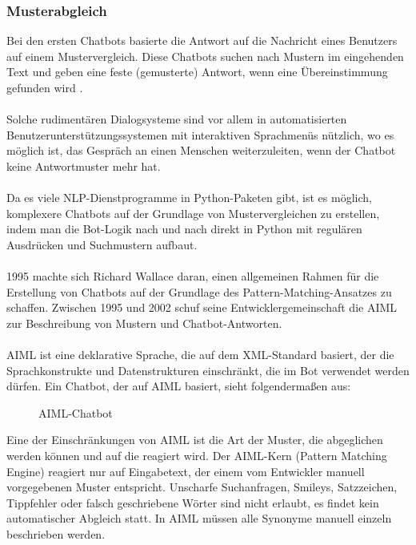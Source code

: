 \subsubsection{Musterabgleich}
Bei den ersten Chatbots basierte die Antwort auf die Nachricht eines Benutzers auf einem Mustervergleich. 
Diese Chatbots suchen nach Mustern im eingehenden Text und geben eine feste (gemusterte) Antwort, wenn eine Übereinstimmung gefunden wird \cite{woudenberg_chatbot_2014}.\\\\
Solche rudimentären Dialogsysteme sind vor allem in automatisierten Benutzerunterstützungssystemen mit interaktiven Sprachmenüs nützlich, wo es möglich ist, das Gespräch an einen Menschen weiterzuleiten, wenn der Chatbot keine Antwortmuster mehr hat.\\\\
Da es viele \ac{NLP}-Dienstprogramme in Python-Paketen gibt, ist es möglich, komplexere Chatbots auf der Grundlage von Mustervergleichen zu erstellen, indem man die Bot-Logik nach und nach direkt in Python mit regulären Ausdrücken und Suchmustern aufbaut.\\\\
1995 machte sich Richard Wallace daran, einen allgemeinen Rahmen für die Erstellung von Chatbots auf der Grundlage des Pattern-Matching-Ansatzes zu schaffen. Zwischen 1995 und 2002 schuf seine Entwicklergemeinschaft die \ac{AIML} zur Beschreibung von Mustern und Chatbot-Antworten.\\\\
\ac{AIML} ist eine deklarative Sprache, die auf dem \ac{XML}-Standard basiert, der die Sprachkonstrukte und Datenstrukturen einschränkt, die im Bot verwendet werden dürfen. \cite{noauthor_aiml_nodate}
Ein Chatbot, der auf \ac{AIML} basiert, sieht folgendermaßen aus:
\begin{figure}[H]
    \centering
    \caption{\label{figure:Aiml_Bot}AIML-Chatbot}
\end{figure}
\noindent
Eine der Einschränkungen von \ac{AIML} ist die Art der Muster, die abgeglichen werden können und auf die reagiert wird. 
Der \ac{AIML}-Kern (Pattern Matching Engine) reagiert nur auf Eingabetext, der einem vom Entwickler manuell vorgegebenen Muster entspricht. 
Unscharfe Suchanfragen, Smileys, Satzzeichen, Tippfehler oder falsch geschriebene Wörter sind nicht erlaubt, es findet kein automatischer Abgleich statt. 
In \ac{AIML} müssen alle Synonyme manuell einzeln beschrieben werden.
